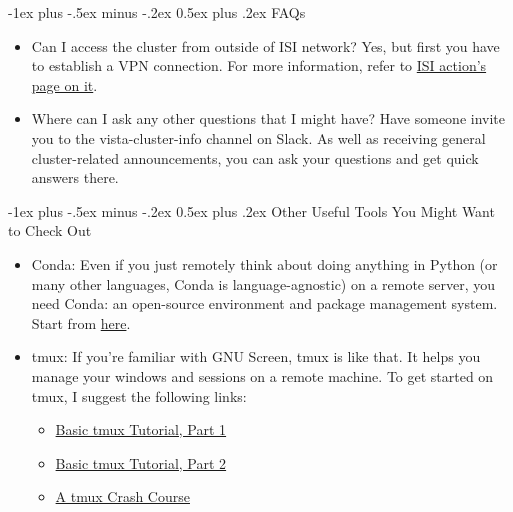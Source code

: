 \documentclass[10pt,landscape]{article}
\makeatletter
\renewcommand{\section}{\@startsection{section}{1}{0mm}%
                                {-1ex plus -.5ex minus -.2ex}%
                                {0.5ex plus .2ex}%
                                {\normalfont\large\bfseries}}
\newcommand{\M}[1]{\todo[inline,backgroundcolor=lime!20!lime]{MG: #1}}
\makeatother
\begin{document}
\begin{multicols}{3}
\section{FAQs}
\begin{itemize}
\item Can I access the cluster from outside of ISI network?
Yes, but first you have to establish a VPN connection. For more information, refer to \href{https://action.isi.edu/help/vpn/}{ISI action's page on it}.
\item Where can I ask any other questions that I might have?
Have someone invite you to the vista-cluster-info channel on Slack. As well as receiving general cluster-related announcements, you can ask your questions and get quick answers there.
\end{itemize}

\section{Other Useful Tools You Might Want to Check Out}
\begin{itemize}
\item Conda: Even if you just remotely think about doing anything in Python (or many other languages, Conda is language-agnostic) on a remote server, you need Conda: an open-source environment and package management system. Start from \href{https://conda.io/docs/user-guide/getting-started.html}{here}.
\item tmux: If you're familiar with GNU Screen, tmux is like that. It helps you manage your windows and sessions on a remote machine. To get started on tmux, I suggest the following links:
\begin{itemize}
\item \href{https://www.youtube.com/watch?v=BHhA_ZKjyxo}{Basic tmux Tutorial, Part 1}
\item \href{https://www.youtube.com/watch?v=norO25P7xHg}{Basic tmux Tutorial, Part 2}
\item \href{https://robots.thoughtbot.com/a-tmux-crash-course}{A tmux Crash Course}
\end{itemize}
\end{itemize}

\end{multicols}
\end{document}
